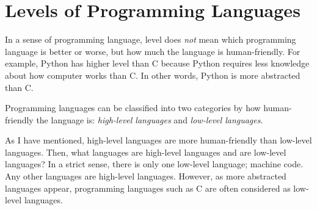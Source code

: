 \section{Levels of Programming Languages}

In a sense of programming language, level does \emph{not} mean which
programming language is better or worse, but how much the language is
human-friendly. For example, Python has higher level than C because Python
requires less knowledge about how computer works than C. In other words,
Python is more abstracted than C.

Programming languages can be classified into two categories by how
human-friendly the language is: \emph{high-level languages} and
\emph{low-level languages}.

As I have mentioned, high-level languages are more human-friendly than
low-level languages. Then, what languages are high-level languages and are
low-level languages? In a strict sense, there is only one low-level
language; machine code. Any other languages are high-level languages.
However, as more abstracted languages appear, programming languages such
as C are often considered as low-level languages.
